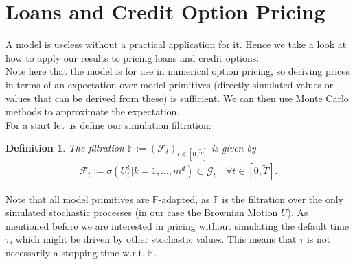 \documentclass[12pt]{article}
\newtheorem{definition}[theorem]{Definition}
\begin{document}
	
	\pagebreak
	\section{Loans and Credit Option Pricing}\label{sec:pricing}
	A model is useless without a practical application for it. Hence we take a look at how to apply our results to pricing loans and credit options.\\
	Note here that the model is for use in numerical option pricing, so deriving prices in terms of an expectation over model primitives (directly simulated values or values that can be derived from these) is sufficient. We can then use Monte Carlo methods to approximate the expectation.\\
	For a start let us define our simulation filtration:
	\begin{definition}
		The filtration $\mathbb{F} := (\mathcal{F}_t)_{t\in\left[0,\tilde{T}\right]}$ is given by
		\begin{align*}
			\mathcal{F}_t := \sigma(U^k_t | k = 1, ..., m^d) \subset \mathcal{G}_t \quad \forall t \in  [0,\tilde{T}].
		\end{align*}
	\end{definition}
	Note that all model primitives are $\mathbb{F}$-adapted, as $\mathbb{F}$ is the filtration over the only simulated stochastic processes (in our case the Brownian Motion $U$). As mentioned before we are interested in pricing without simulating the default time $\tau$, which might be driven by other stochastic values. This means that $\tau$ is not necessarily a stopping time w.r.t. $\mathbb{F}$.
	
\end{document}
